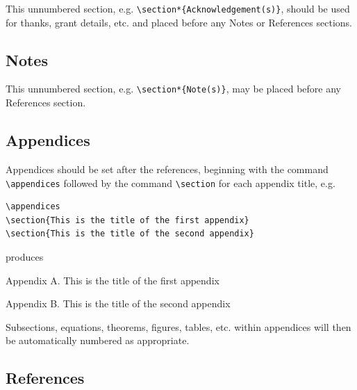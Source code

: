 \documentclass[]{tGIS2e}
\begin{document}
This unnumbered section, e.g. \verb"\section*{Acknowledgement(s)}", should be used for thanks, grant details, etc.
and placed before any Notes or References sections.

\subsection{Notes}

This unnumbered section, e.g. \verb"\section*{Note(s)}", may be placed before any References section.

\subsection{Appendices}

Appendices should be set after the references, beginning with the
command \verb"\appendices" followed by the command \verb"\section"
for each appendix title, e.g.
%
\begin{verbatim}
\appendices
\section{This is the title of the first appendix}
\section{This is the title of the second appendix}
\end{verbatim}

\noindent produces\medskip

\noindent Appendix A. This is the title of the first appendix

\noindent Appendix B. This is the title of the second appendix

\medskip
Subsections, equations, theorems, figures, tables, etc. within
appendices will then be automatically numbered as appropriate.


\subsection{References}\label{refs}
\end{document}
